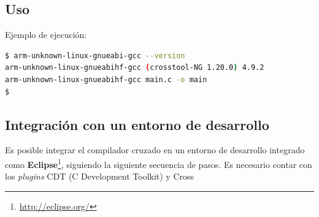 \documentclass{article}
\begin{document}
\subsection{Uso}

Ejemplo de ejecución:

\begin{lstlisting}[language=bash]
$ arm-unknown-linux-gnueabi-gcc --version
arm-unknown-linux-gnueabihf-gcc (crosstool-NG 1.20.0) 4.9.2
arm-unknown-linux-gnueabihf-gcc main.c -o main
$
\end{lstlisting}

\subsection{Integración con un entorno de desarrollo}

Es posible integrar el compilador cruzado en un entorno de desarrollo integrado como \textbf{Eclipse}\footnote{\href{http://eclipse.org/}{http://eclipse.org/}}, siguiendo la siguiente secuencia de pasos. Es necesario contar con los \textit{plugins} CDT (C Development Toolkit) y Cross
\end{document}
